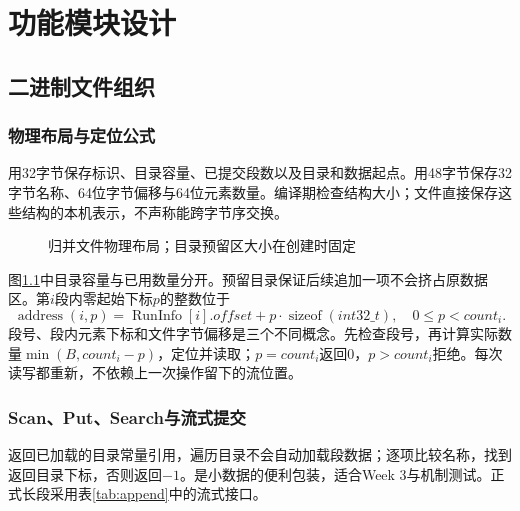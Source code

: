\chapter{功能模块设计}
\section{二进制文件组织}
\subsection{物理布局与定位公式}
用32字节保存标识、目录容量、已提交段数以及目录和数据起点。用48字节保存32字节名称、64位字节偏移与64位元素数量。编译期检查结构大小；文件直接保存这些结构的本机表示，不声称能跨字节序交换。

\begin{figure}[htbp]\centering
{}\caption{归并文件物理布局；目录预留区大小在创建时固定}\label{fig:file-layout}\end{figure}

图\ref{fig:file-layout}中目录容量与已用数量分开。预留目录保证后续追加一项不会挤占原数据区。第$i$段内零起始下标$p$的整数位于
\begin{equation}
\operatorname{address}(i,p)=\operatorname{RunInfo}[i].offset+p\cdot\operatorname{sizeof}(int32\_t),\quad 0\le p<count_i.
\end{equation}
段号、段内元素下标和文件字节偏移是三个不同概念。先检查段号，再计算实际数量$\min(B,count_i-p)$，定位并读取；$p=count_i$返回0，$p>count_i$拒绝。每次读写都重新，不依赖上一次操作留下的流位置。

\subsection{Scan、Put、Search与流式提交}
返回已加载的目录常量引用，遍历目录不会自动加载段数据；逐项比较名称，找到返回目录下标，否则返回$-1$。是小数据的便利包装，适合Week 3与机制测试。正式长段采用表\ref{tab:append}中的流式接口。


